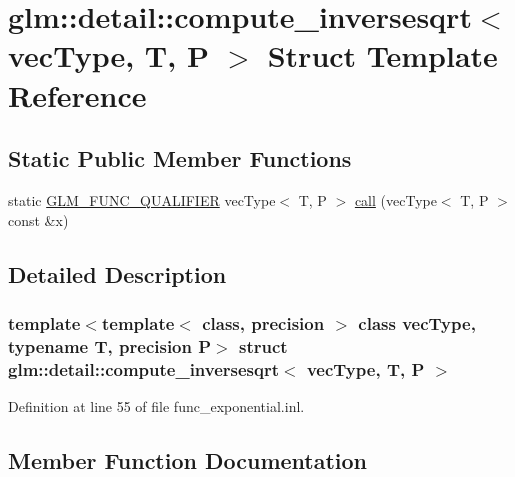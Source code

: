 \hypertarget{structglm_1_1detail_1_1compute__inversesqrt}{}\section{glm\+:\+:detail\+:\+:compute\+\_\+inversesqrt$<$ vec\+Type, T, P $>$ Struct Template Reference}
\label{structglm_1_1detail_1_1compute__inversesqrt}
\subsection*{Static Public Member Functions}
\begin{DoxyCompactItemize}
\item 
static \hyperlink{setup_8hpp_a33fdea6f91c5f834105f7415e2a64407}{G\+L\+M\+\_\+\+F\+U\+N\+C\+\_\+\+Q\+U\+A\+L\+I\+F\+I\+ER} vec\+Type$<$ T, P $>$ \hyperlink{structglm_1_1detail_1_1compute__inversesqrt_a691942b1bfc04c3563e179ff2fef5375}{call} (vec\+Type$<$ T, P $>$ const \&x)
\end{DoxyCompactItemize}


\subsection{Detailed Description}
\subsubsection*{template$<$template$<$ class, precision $>$ class vec\+Type, typename T, precision P$>$\newline
struct glm\+::detail\+::compute\+\_\+inversesqrt$<$ vec\+Type, T, P $>$}



Definition at line 55 of file func\+\_\+exponential.\+inl.



\subsection{Member Function Documentation}
\mbox{\label{structglm_1_1detail_1_1compute__inversesqrt_a691942b1bfc04c3563e179ff2fef5375}} 

